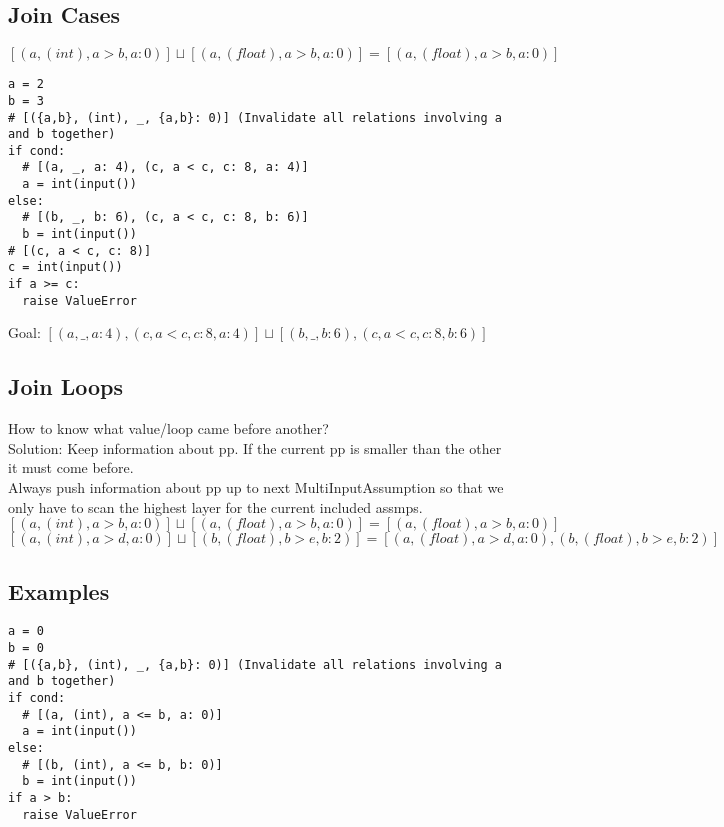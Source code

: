 \documentclass[11pt]{article}
\begin{document}
\subsection{Join Cases}

$[(a, (int), a > b, a{:}0)] \sqcup [(a, (float), a > b, a{:}0)] = [(a, (float), a > b, a{:}0)]$\\

\begin{lstlisting}
a = 2
b = 3
# [({a,b}, (int), _, {a,b}: 0)] (Invalidate all relations involving a and b together)
if cond:
  # [(a, _, a: 4), (c, a < c, c: 8, a: 4)]
  a = int(input())
else:
  # [(b, _, b: 6), (c, a < c, c: 8, b: 6)]
  b = int(input())
# [(c, a < c, c: 8)]
c = int(input())
if a >= c:
  raise ValueError
\end{lstlisting}


Goal: $[(a, \_, a: 4), (c, a < c, c: 8, a: 4)] \sqcup [(b, \_, b: 6), (c, a < c, c: 8, b: 6)]$

\subsection{Join Loops}

How to know what value/loop came before another?\\
Solution: Keep information about pp. If the current pp is smaller than the other it must come before.\\
Always push information about pp up to next MultiInputAssumption so that we only have to scan the highest layer for the current included assmps.\\
$[(a, (int), a > b, a{:}0)] \sqcup [(a, (float), a > b, a{:}0)] = [(a, (float), a > b, a{:}0)]$\\
$[(a, (int), a > d, a{:}0)] \sqcup [(b, (float), b > e, b{:}2)] = [(a, (float), a > d, a{:}0), (b, (float), b > e, b{:}2)]$\\


\subsection{Examples}

\begin{lstlisting}
a = 0
b = 0
# [({a,b}, (int), _, {a,b}: 0)] (Invalidate all relations involving a and b together)
if cond:
  # [(a, (int), a <= b, a: 0)]
  a = int(input())
else:
  # [(b, (int), a <= b, b: 0)]
  b = int(input())
if a > b:
  raise ValueError
\end{lstlisting}
\end{document}
